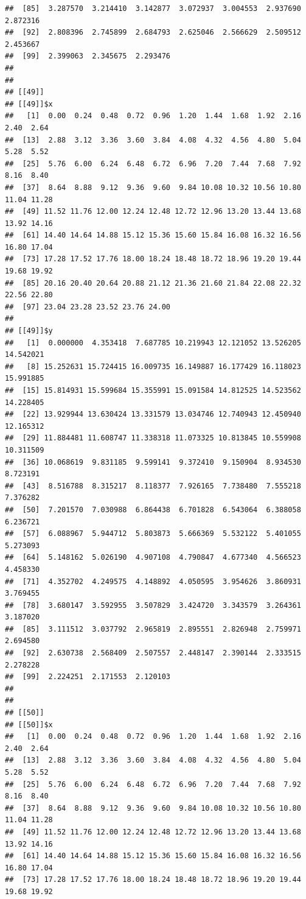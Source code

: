 \documentclass[
  ignorenonframetext,
]{beamer}
\begin{document}
\begin{frame}[fragile]{}
\begin{verbatim}
##  [85]  3.287570  3.214410  3.142877  3.072937  3.004553  2.937690  2.872316
##  [92]  2.808396  2.745899  2.684793  2.625046  2.566629  2.509512  2.453667
##  [99]  2.399063  2.345675  2.293476
## 
## 
## [[49]]
## [[49]]$x
##   [1]  0.00  0.24  0.48  0.72  0.96  1.20  1.44  1.68  1.92  2.16  2.40  2.64
##  [13]  2.88  3.12  3.36  3.60  3.84  4.08  4.32  4.56  4.80  5.04  5.28  5.52
##  [25]  5.76  6.00  6.24  6.48  6.72  6.96  7.20  7.44  7.68  7.92  8.16  8.40
##  [37]  8.64  8.88  9.12  9.36  9.60  9.84 10.08 10.32 10.56 10.80 11.04 11.28
##  [49] 11.52 11.76 12.00 12.24 12.48 12.72 12.96 13.20 13.44 13.68 13.92 14.16
##  [61] 14.40 14.64 14.88 15.12 15.36 15.60 15.84 16.08 16.32 16.56 16.80 17.04
##  [73] 17.28 17.52 17.76 18.00 18.24 18.48 18.72 18.96 19.20 19.44 19.68 19.92
##  [85] 20.16 20.40 20.64 20.88 21.12 21.36 21.60 21.84 22.08 22.32 22.56 22.80
##  [97] 23.04 23.28 23.52 23.76 24.00
## 
## [[49]]$y
##   [1]  0.000000  4.353418  7.687785 10.219943 12.121052 13.526205 14.542021
##   [8] 15.252631 15.724415 16.009735 16.149887 16.177429 16.118023 15.991885
##  [15] 15.814931 15.599684 15.355991 15.091584 14.812525 14.523562 14.228405
##  [22] 13.929944 13.630424 13.331579 13.034746 12.740943 12.450940 12.165312
##  [29] 11.884481 11.608747 11.338318 11.073325 10.813845 10.559908 10.311509
##  [36] 10.068619  9.831185  9.599141  9.372410  9.150904  8.934530  8.723191
##  [43]  8.516788  8.315217  8.118377  7.926165  7.738480  7.555218  7.376282
##  [50]  7.201570  7.030988  6.864438  6.701828  6.543064  6.388058  6.236721
##  [57]  6.088967  5.944712  5.803873  5.666369  5.532122  5.401055  5.273093
##  [64]  5.148162  5.026190  4.907108  4.790847  4.677340  4.566523  4.458330
##  [71]  4.352702  4.249575  4.148892  4.050595  3.954626  3.860931  3.769455
##  [78]  3.680147  3.592955  3.507829  3.424720  3.343579  3.264361  3.187020
##  [85]  3.111512  3.037792  2.965819  2.895551  2.826948  2.759971  2.694580
##  [92]  2.630738  2.568409  2.507557  2.448147  2.390144  2.333515  2.278228
##  [99]  2.224251  2.171553  2.120103
## 
## 
## [[50]]
## [[50]]$x
##   [1]  0.00  0.24  0.48  0.72  0.96  1.20  1.44  1.68  1.92  2.16  2.40  2.64
##  [13]  2.88  3.12  3.36  3.60  3.84  4.08  4.32  4.56  4.80  5.04  5.28  5.52
##  [25]  5.76  6.00  6.24  6.48  6.72  6.96  7.20  7.44  7.68  7.92  8.16  8.40
##  [37]  8.64  8.88  9.12  9.36  9.60  9.84 10.08 10.32 10.56 10.80 11.04 11.28
##  [49] 11.52 11.76 12.00 12.24 12.48 12.72 12.96 13.20 13.44 13.68 13.92 14.16
##  [61] 14.40 14.64 14.88 15.12 15.36 15.60 15.84 16.08 16.32 16.56 16.80 17.04
##  [73] 17.28 17.52 17.76 18.00 18.24 18.48 18.72 18.96 19.20 19.44 19.68 19.92

\end{verbatim}
\end{frame}
\end{document}
